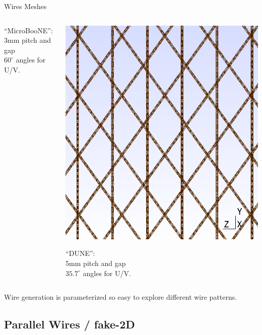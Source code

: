 \documentclass[xcolor=dvipsnames]{beamer}
\newcommand{\microboone}{MicroBooNE\xspace}
\begin{document}
\begin{frame}{Wires Meshes}
\begin{columns}
\begin{column}{0.3\textwidth}
\begin{center}
        ``\microboone'':\\3mm pitch and gap\\$60^\circ$ angles for U/V.
      \end{center}
    \end{column}
    \begin{column}{0.3\textwidth}
      \begin{center}
        \includegraphics[height=0.4\textheight]{dune-mesh.png}      

        ``DUNE'':\\5mm pitch and gap\\$35.7^\circ$ angles for U/V.
      \end{center}
    \end{column}
  \end{columns}

  \vfill

  Wire generation is parameterized so easy to explore different wire patterns.
\end{frame}

\subsection{Parallel Wires / fake-2D}
\end{document}
